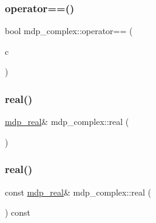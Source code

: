 \mbox{\label{classmdp__complex_a51ddcf2928115838abd81fd365876d19}} 
\subsubsection{\texorpdfstring{operator==()}{operator==()}}
{\footnotesize\ttfamily bool mdp\+\_\+complex\+::operator== (\begin{DoxyParamCaption}\item[{const \hyperlink{classmdp__complex}{mdp\+\_\+complex} \&}]{c }\end{DoxyParamCaption})\hspace{0.3cm}{\ttfamily [inline]}}

\mbox{\label{classmdp__complex_ad24f185648ad4231abbf362ed1fab64b}} 
\subsubsection{\texorpdfstring{real()}{real()}\hspace{0.1cm}{\footnotesize\ttfamily [1/2]}}
{\footnotesize\ttfamily \hyperlink{mdp__global__vars_8h_a69d96b74c791e0bbdb888b3913a69450}{mdp\+\_\+real}\& mdp\+\_\+complex\+::real (\begin{DoxyParamCaption}{ }\end{DoxyParamCaption})\hspace{0.3cm}{\ttfamily [inline]}}

\mbox{\label{classmdp__complex_af691671fa4c4256da287ab8a017d3614}} 
\subsubsection{\texorpdfstring{real()}{real()}\hspace{0.1cm}{\footnotesize\ttfamily [2/2]}}
{\footnotesize\ttfamily const \hyperlink{mdp__global__vars_8h_a69d96b74c791e0bbdb888b3913a69450}{mdp\+\_\+real}\& mdp\+\_\+complex\+::real (\begin{DoxyParamCaption}{ }\end{DoxyParamCaption}) const\hspace{0.3cm}{\ttfamily [inline]}}



